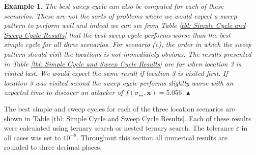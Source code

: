 \documentclass[11pt,a4paper]{article}
\newtheorem{exmp}[theorem]{Example}
\newcommand{\hl}[1]{{\color{yellow}#1}}
\newcommand{\kyle}[1]{{\color{orange}#1}}
\begin{document}
\begin{exmp}
The best sweep cycle can also be computed for each of these scenarios.
These are not the sorts of problems where we would expect a sweep pattern to perform well and indeed we can see from Table \ref{tbl: Simple Cycle and Sweep Cycle Results} that the best sweep cycle performs worse than the best simple cycle for all three scenarios.
For scenario (c), the order in which the sweep pattern should visit the locations is not immediately obvious.
The results presented in Table \ref{tbl: Simple Cycle and Sweep Cycle Results} are for when location 3 is visited last. We would expect the same result if location 3 is visited first.
If location 3 was visited second the sweep cycle performs slightly worse with an expected time to discover an attacker of $f(\sigma_\leftrightarrow,\textbf{x}) = 5.056$.
\hfill $\blacktriangle$
\end{exmp}


The best simple and sweep cycles for each of the three location scenarios are shown in Table \ref{tbl: Simple Cycle and Sweep Cycle Results}.
Each of these results were calculated using ternary search or nested ternary search. The tolerance $\varepsilon$ in all cases was set to $10^{-8}$.
Throughout this section all numerical results are rounded to three decimal places.
\end{document}
